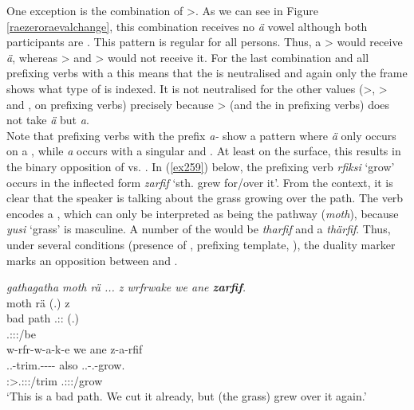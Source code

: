 One exception is the combination of \Sg>\Sg{}. As we can see in Figure \ref{raezeroraevalchange}, this combination receives no \emph{ä} vowel although both participants are . This pattern is regular for all persons. Thus, a \Pl>\Tsg{} would receive \emph{ä}, whereas \Du>\Tsg{} and \Sg>\Tsg{} would not receive it. For the last combination and all prefixing verbs with a \Tsg{} this means that the  is neutralised and again only the  frame shows what type of  is indexed. It is not neutralised for the other  values (\Sg>\Fsg{}, \Sg>\Ssg{} and \Fsg{}, \Ssg{} on prefixing verbs) precisely because \Sg>\Sg{} (and the \Sg{} in prefixing verbs) does not take \emph{ä} but \emph{a}.\\

Note that prefixing verbs with the  prefix \emph{a-} show a pattern where \emph{ä} only occurs on a , while \emph{a} occurs with a singular and  . At least on the surface, this results in the binary opposition of  vs. . In (\ref{ex259}) below, the prefixing verb \emph{rfiksi} `grow' occurs in the inflected form \emph{zarfif} `sth. grew for/over it'. From the context, it is clear that the speaker is talking about the grass growing over the path. The verb encodes a  , which can only be interpreted as being the pathway (\emph{moth}), because \emph{yusi} `grass' is masculine. A  number of the  would be \emph{tharfif} and a  \emph{thärfif}. Thus, under several conditions (presence of , prefixing template, ), the duality marker marks an opposition between  and .

\begin{exe}
	\ex \emph{gathagatha moth rä ... z wrfrwake we ane \textbf{zarfif}.}\\
	 moth rä (.) z\\
	bad path \Tsg.\F:\Cop:\Ndu{} (.) \Iam{}\\
	{} {} \footnotesize{\Tsg.\F:\Sbj:\Nonpast:\Ipfv/be} {} {}\\
	\sn
	\glll w-rfr-w-a-k-e we ane z-a-rfif\\
	\Tsg.\F.\Alph-trim.\Ext-\Ndu-\Pst-\Lk-\Fnsg{} also \Dem{} \Tsg.\F.\Gam-\Ndu.\Vc-grow.\Rs\\
	\footnotesize{\Fpl:\Sbj>\Tsg.\F:\Obj:\Pst:\Ipfv/trim} {} {} \footnotesize{\Tsg.\F:\Io:\Rpst:\Pfv/grow}\\
	\trans `This is a bad path. We cut it already, but (the grass) grew over it again.'\\
	\label{ex259}
\end{exe}


